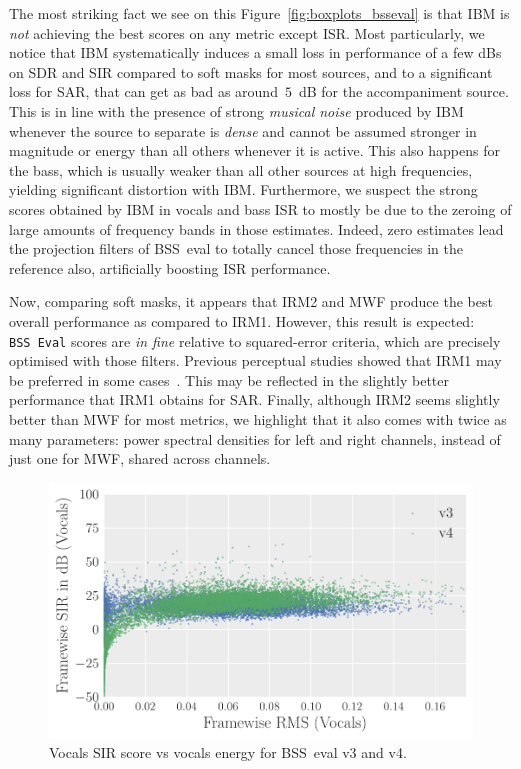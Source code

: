 \documentclass{llncs}
\begin{document}
The most striking fact we see on this Figure~\ref{fig:boxplots_bsseval} is that IBM is \textit{not} achieving the best scores on any metric except ISR. Most particularly, we notice that IBM systematically induces a small loss in performance of a few dBs on SDR and SIR compared to soft masks for most sources, and to a significant loss for SAR, that can get as bad as around~$5$~dB for the accompaniment source. This is in line with the presence of strong \textit{musical noise} produced by IBM whenever the source to separate is \textit{dense} and cannot be assumed stronger in magnitude or energy than all others whenever it is active. This also happens for the bass, which is usually weaker than all other sources at high frequencies, yielding significant distortion with IBM. Furthermore, we suspect the strong scores obtained by IBM in vocals and bass ISR to mostly be due to the zeroing of large amounts of frequency bands in those estimates. Indeed, zero estimates lead the projection filters of BSS~eval to totally cancel those frequencies in the reference also, artificially boosting ISR performance.

Now, comparing soft masks, it appears that IRM2 and MWF produce the best overall performance as compared to IRM1. However, this result is expected: \texttt{BSS~Eval} scores are \textit{in fine} relative to squared-error criteria, which are precisely optimised with those filters. Previous perceptual studies showed that IRM1 may be preferred in some cases~\cite{liutkus15}. This may be reflected in the slightly better performance that IRM1 obtains for SAR. Finally, although IRM2 seems slightly better than MWF for most metrics, we highlight that it also comes with twice as many parameters: power spectral densities for left and right channels, instead of just one for MWF, shared across channels.

\begin{figure}[ht]
  \begin{center}
     \includegraphics[width=0.7\linewidth]{fig/evaluation_v3v4.pdf}
     \vspace{-1cm}
  \end{center}
  \caption{Vocals SIR score vs vocals energy for BSS~eval v3 and v4.  }
  \label{fig:v3v4}
\end{figure}
\end{document}
